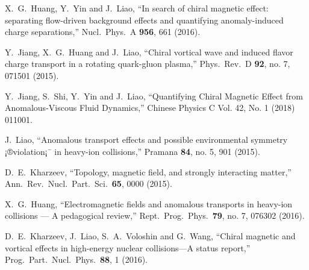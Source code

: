 \documentclass[aps,prd,amsmath,two column,amssymb,showpacs]{revtex4}
\begin{document}
\begin{thebibliography}{99}
X.~G.~Huang, Y.~Yin and J.~Liao,
``In search of chiral magnetic effect: separating flow-driven background effects and quantifying anomaly-induced charge separations,''
Nucl.\ Phys.\ A {\bf 956}, 661 (2016).%

Y.~Jiang, X.~G.~Huang and J.~Liao,
``Chiral vortical wave and induced flavor charge transport in a rotating quark-gluon plasma,''
Phys.\ Rev.\ D {\bf 92}, no. 7, 071501 (2015).%

Y.~Jiang, S.~Shi, Y.~Yin and J.~Liao,
``Quantifying Chiral Magnetic Effect from Anomalous-Viscous Fluid Dynamics,''
Chinese Physics C Vol. 42, No. 1 (2018) 011001.%



J.~Liao,
``Anomalous transport effects and possible environmental symmetry ¡®violation¡¯ in heavy-ion collisions,''
Pramana {\bf 84}, no. 5, 901 (2015).%

D.~E.~Kharzeev,
``Topology, magnetic field, and strongly interacting matter,''
Ann.\ Rev.\ Nucl.\ Part.\ Sci.\  {\bf 65}, 0000 (2015).%


X.~G.~Huang,
``Electromagnetic fields and anomalous transports in heavy-ion collisions --- A pedagogical review,''
Rept.\ Prog.\ Phys.\  {\bf 79}, no. 7, 076302 (2016).%

D.~E.~Kharzeev, J.~Liao, S.~A.~Voloshin and G.~Wang,
``Chiral magnetic and vortical effects in high-energy nuclear collisions—A status report,''
Prog.\ Part.\ Nucl.\ Phys.\  {\bf 88}, 1 (2016).%


\end{thebibliography}
\end{document}
